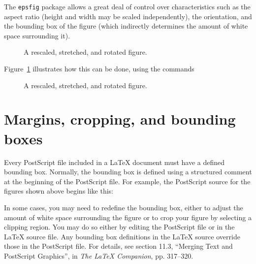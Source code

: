 \documentclass{book}
\begin{document}
%
The {\tt epsfig} package allows a great deal of control over characteristics
such as the aspect ratio (height and width may be scaled independently), the
orientation, and the bounding box of the figure (which indirectly determines
the amount of white space surrounding it).
\begin{figure}
\begin{center}
\end{center}
\caption{A rescaled, stretched, and rotated figure. \label{fig:a3}}
\end{figure}
Figure~\ref{fig:a3} illustrates how this can be done, using the commands
\begin{center}
\begin{boxedverbatim}
\begin{figure}
\begin{center}
\end{center}
\caption{A rescaled, stretched, and rotated figure.}
\end{figure}
\end{boxedverbatim}
\end{center}

\section{Margins, cropping, and bounding boxes \label{sec:margins}}

%
Every PostScript file included in a \LaTeX{} document must have a defined
bounding box.  Normally, the bounding box is defined using a structured comment
at the beginning of the PostScript file.  For example, the PostScript source
for the figures shown above begins like this:
\begin{center}
\begin{boxedverbatim}
\end{boxedverbatim}
\end{center}

In some cases, you may need to redefine the bounding box, either to
adjust the amount of white space surrounding the figure or to crop
your figure by selecting a clipping region.  You may do so either by
editing the PostScript file or in the \LaTeX{} source file.  Any
bounding box definitions in the \LaTeX{} source override those in the
PostScript file.  For details, see section 11.3, ``Merging Text and
PostScript Graphics'', in {\em The \LaTeX{} Companion}, pp. 317--320.
\end{document}
